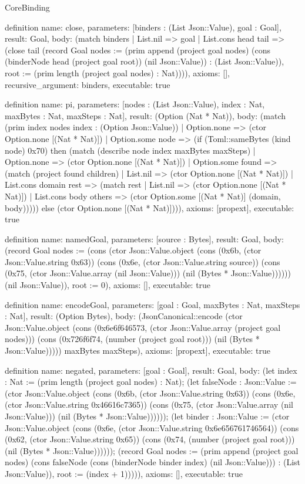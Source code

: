 \begin{lexlean}{CoreBinding}
\begin{semanticmodule}
definition{
 name: close,
 parameters: [binders : (List Json::Value), goal : Goal],
 result: Goal,
 body: (match binders | List.nil => goal | List.cons head tail => (close tail (record Goal {nodes := (prim append (project goal nodes) (cons (binderNode head (project goal root)) (nil Json::Value)) : (List Json::Value)), root := (prim length (project goal nodes) : Nat)}))),
 axioms: [],
 recursive_argument: binders,
 executable: true
}

definition{
 name: pi,
 parameters: [nodes : (List Json::Value), index : Nat, maxBytes : Nat, maxSteps : Nat],
 result: (Option (Nat * Nat)),
 body: (match (prim index nodes index : (Option Json::Value)) | Option.none => (ctor Option.none [(Nat * Nat)]) | Option.some node => (if (Toml::sameBytes (kind node) 0x70) then (match (describe node index maxBytes maxSteps) | Option.none => (ctor Option.none [(Nat * Nat)]) | Option.some found => (match (project found children) | List.nil => (ctor Option.none [(Nat * Nat)]) | List.cons domain rest => (match rest | List.nil => (ctor Option.none [(Nat * Nat)]) | List.cons body others => (ctor Option.some [(Nat * Nat)] (domain, body))))) else (ctor Option.none [(Nat * Nat)]))),
 axioms: [propext],
 executable: true
}

definition{
 name: namedGoal,
 parameters: [source : Bytes],
 result: Goal,
 body: (record Goal {nodes := (cons (ctor Json::Value.object (cons (0x6b, (ctor Json::Value.string 0x63)) (cons (0x6e, (ctor Json::Value.string source)) (cons (0x75, (ctor Json::Value.array (nil Json::Value))) (nil (Bytes * Json::Value)))))) (nil Json::Value)), root := 0}),
 axioms: [],
 executable: true
}

definition{
 name: encodeGoal,
 parameters: [goal : Goal, maxBytes : Nat, maxSteps : Nat],
 result: (Option Bytes),
 body: (JsonCanonical::encode (ctor Json::Value.object (cons (0x6e6f646573, (ctor Json::Value.array (project goal nodes))) (cons (0x726f6f74, (number (project goal root))) (nil (Bytes * Json::Value))))) maxBytes maxSteps),
 axioms: [propext],
 executable: true
}

definition{
 name: negated,
 parameters: [goal : Goal],
 result: Goal,
 body: (let index : Nat := (prim length (project goal nodes) : Nat); (let falseNode : Json::Value := (ctor Json::Value.object (cons (0x6b, (ctor Json::Value.string 0x63)) (cons (0x6e, (ctor Json::Value.string 0x46616c7365)) (cons (0x75, (ctor Json::Value.array (nil Json::Value))) (nil (Bytes * Json::Value)))))); (let binder : Json::Value := (ctor Json::Value.object (cons (0x6e, (ctor Json::Value.string 0x6e656761746564)) (cons (0x62, (ctor Json::Value.string 0x65)) (cons (0x74, (number (project goal root))) (nil (Bytes * Json::Value)))))); (record Goal {nodes := (prim append (project goal nodes) (cons falseNode (cons (binderNode binder index) (nil Json::Value))) : (List Json::Value)), root := (index + 1)})))),
 axioms: [],
 executable: true
}


\end{semanticmodule}
\end{lexlean}
